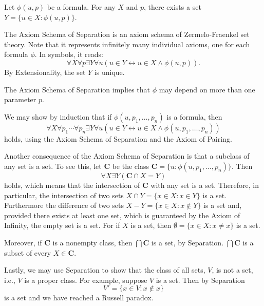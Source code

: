 \documentclass[12pt]{article}
\begin{document}
Let $\phi(u, p)$ be a formula.  For any $X$ and $p$, there exists a set $Y = \{ u \in X : \phi(u, p) \}$.

The Axiom Schema of Separation is an axiom schema of Zermelo-Fraenkel set theory.  Note that it represents infinitely many individual axioms, one for each formula $\phi$.  In symbols, it reads:
\[
\forall X \forall p \exists Y \forall u(u \in Y \leftrightarrow u \in X \land \phi(u, p)).
\]
By Extensionality, the set $Y$ is unique.

The Axiom Schema of Separation implies that $\phi$ may depend on more than one parameter $p$.

We may show by induction that if $\phi(u, p_1, \ldots, p_n)$ is a formula, then
\[
\forall X \forall p_1 \cdots \forall p_n \exists Y \forall u(u \in Y \leftrightarrow u \in X \land \phi(u, p_1, \ldots, p_n))
\]
holds, using the Axiom Schema of Separation and the Axiom of Pairing.

Another consequence of the Axiom Schema of Separation is that a subclass of any set is a set.  To see this, let $\mathbf{C}$ be the class $\mathbf{C} = \{ u : \phi(u, p_1, \ldots, p_n) \}$.  Then
\[
\forall X \exists Y (\mathbf{C} \cap X = Y)
\]
holds, which means that the intersection of $\mathbf{C}$ with any set is a set.  Therefore, in particular, the intersection of two sets $X \cap Y = \{ x \in X : x \in Y \}$ is a set.  Furthermore the difference of two sets $X - Y = \{ x \in X : x \notin Y \}$ is a set and, provided there exists at least one set, which is guaranteed by the Axiom of Infinity, the empty set is a set.  For if $X$ is a set, then $\emptyset = \{ x \in X : x \neq x \}$ is a set.

Moreover, if $\mathbf{C}$ is a nonempty class, then $\bigcap \mathbf{C}$ is a set, by Separation.  $\bigcap \mathbf{C}$ is a subset of every $X \in \mathbf{C}$.

Lastly, we may use Separation to show that the class of all sets, $V$, is not a set, i.e., $V$ is a proper class.  For example, suppose $V$ is a set.  Then by Separation
\[
V' = \{ x \in V : x \notin x \}
\]
is a set and we have reached a Russell paradox.
\end{document}
